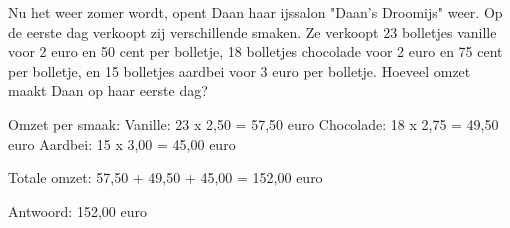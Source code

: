 \begin{opgave}
Nu het weer zomer wordt, opent Daan haar ijssalon "Daan's Droomijs" weer.
Op de eerste dag verkoopt zij verschillende smaken. Ze verkoopt 23 bolletjes vanille voor 
2 euro en 50 cent per bolletje, 18 bolletjes chocolade voor 2 euro en 75 cent 
per bolletje, en 15 bolletjes aardbei voor 3 euro per bolletje. Hoeveel 
omzet maakt Daan op haar eerste dag?
\end{opgave}

\begin{oplossing}
Omzet per smaak:
Vanille: 23 x 2,50 = 57,50 euro
Chocolade: 18 x 2,75 = 49,50 euro
Aardbei: 15 x 3,00 = 45,00 euro

Totale omzet:
57,50 + 49,50 + 45,00 = 152,00 euro

Antwoord: 152,00 euro
\end{oplossing}